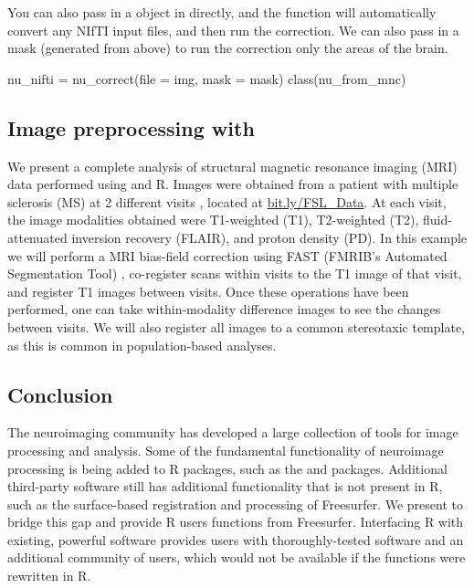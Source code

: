 You can also pass in a  object in directly, and the
  function will automatically convert
any NIfTI input files, and then run the correction. We can also pass in
a mask (generated from above) to run the correction only the areas of
the brain.

\begin{Schunk}
\begin{Sinput}
nu_nifti = nu_correct(file = img, mask = mask)
class(nu_from_mnc)
\end{Sinput}
\end{Schunk}

\subsection{Image preprocessing with }

We present a complete analysis of structural magnetic resonance imaging
(MRI) data performed using  and R. Images were obtained from a
patient with multiple sclerosis (MS) at 2 different visits
\citep{sweeney_automatic_2013}, located at \url{bit.ly/FSL_Data}. At
each visit, the image modalities obtained were T1-weighted (T1),
T2-weighted (T2), fluid-attenuated inversion recovery (FLAIR), and
proton density (PD). In this example we will perform a MRI bias-field
correction using FAST (FMRIB's Automated Segmentation Tool)
\citep{zhang_segmentation_2001}, co-register scans within visits to the
T1 image of that visit, and register T1 images between visits. Once
these operations have been performed, one can take within-modality
difference images to see the changes between visits. We will also
register all images to a common stereotaxic template, as this is common
in population-based analyses.

\subsection{Conclusion}\label{conclusion}

The neuroimaging community has developed a large collection of tools for
image processing and analysis. Some of the fundamental functionality of
neuroimage processing is being added to R packages, such as the
 and  packages. Additional third-party software
still has additional functionality that is not present in R, such as the
surface-based registration and processing of Freesurfer. We present
 to bridge this gap and provide R users functions from
Freesurfer. Interfacing R with existing, powerful software provides
users with thoroughly-tested software and an additional community of
users, which would not be available if the functions were rewritten in
R.

